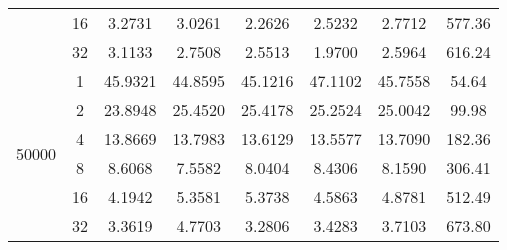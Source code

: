 \begin{tabularx}{\textwidth}{@{} c c c c c c c c @{}}
                           & 16 & 3.2731  & 3.0261  & 2.2626  & 2.5232  & 2.7712  & 577.36 \\
                           & 32 & 3.1133  & 2.7508  & 2.5513  & 1.9700  & 2.5964  & 616.24 \\
\midrule
    \multirow{6}{*}{50000} & 1  & 45.9321 & 44.8595 & 45.1216 & 47.1102 & 45.7558 & 54.64  \\
                           & 2  & 23.8948 & 25.4520 & 25.4178 & 25.2524 & 25.0042 & 99.98  \\
                           & 4  & 13.8669 & 13.7983 & 13.6129 & 13.5577 & 13.7090 & 182.36 \\
                           & 8  & 8.6068  & 7.5582  & 8.0404  & 8.4306  & 8.1590  & 306.41 \\
                           & 16 & 4.1942  & 5.3581  & 5.3738  & 4.5863  & 4.8781  & 512.49 \\
                           & 32 & 3.3619  & 4.7703  & 3.2806  & 3.4283  & 3.7103  & 673.80 \\
\bottomrule
\end{tabularx}
